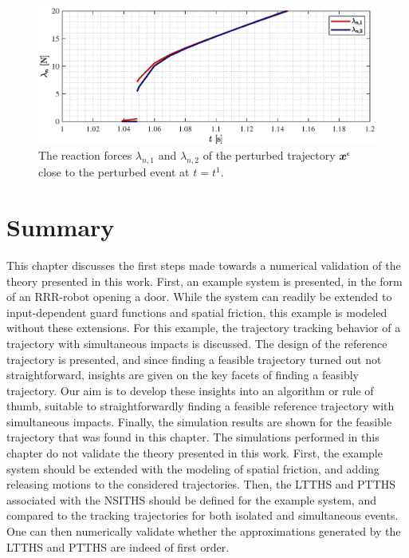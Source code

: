 \documentclass[../DC2019003Bouma.tex]{subfiles}
\begin{document}
\begin{figure}[bt!]
\centering
\includegraphics[width=\textwidth]{lambda.eps}\caption{The reaction forces $\lambda_{n,1}$ and $\lambda_{n,2}$ of the perturbed trajectory ${\boldsymbol{x}}^\epsilon$ close to the perturbed event at $t=t^1$.}\label{fig:5lambda}
\end{figure}

\section{Summary}
This chapter discusses the first steps made towards a numerical validation of the theory presented in this work. First, an example system is presented, in the form of an RRR-robot opening a door. While the system can readily be extended to input-dependent guard functions and spatial friction, this example is modeled without these extensions. For this example, the trajectory tracking behavior of a trajectory with simultaneous impacts is discussed. The design of the reference trajectory is presented, and since finding a feasible trajectory turned out not straightforward, insights are given on the key facets of finding a feasibly trajectory. Our aim is to develop these insights into an algorithm or rule of thumb, suitable to straightforwardly finding a feasible reference trajectory with simultaneous impacts. Finally, the simulation results are shown for the feasible trajectory that was found in this chapter. The simulations performed in this chapter do not validate the theory presented in this work. First, the example system should be extended with the modeling of spatial friction, and adding releasing motions to the considered trajectories. Then, the LTTHS and PTTHS associated with the NSITHS should be defined for the example system, and compared to the tracking trajectories for both isolated and simultaneous events. One can then numerically validate whether the approximations generated by the LTTHS and PTTHS are indeed of first order.
\end{document}
